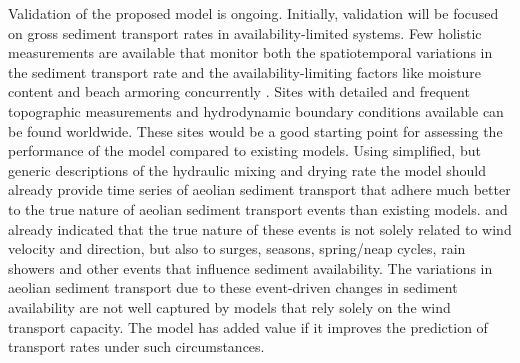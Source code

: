Validation of the proposed model is ongoing. Initially, validation
will be focused on gross sediment transport rates in
availability-limited systems. Few holistic measurements are available
that monitor both the spatiotemporal variations in the sediment
transport rate and the availability-limiting factors like moisture
content and beach armoring concurrently
\citep[e.g.][]{DelgadoFernandez2012, Hoonhout2013}. Sites with
detailed and frequent topographic measurements and hydrodynamic
boundary conditions available can be found worldwide. These sites
would be a good starting point for assessing the performance of the
model compared to existing models. Using simplified, but generic
descriptions of the hydraulic mixing and drying rate the model should
already provide time series of aeolian sediment transport that adhere
much better to the true nature of aeolian sediment transport events
than existing models. \citet{DelgadoFernandez2011} and
\citet{deVries2014b} already indicated that the true nature of these
events is not solely related to wind velocity and direction, but also
to surges, seasons, spring/neap cycles, rain showers and other events
that influence sediment availability. The variations in aeolian
sediment transport due to these event-driven changes in sediment
availability are not well captured by models that rely solely on the
wind transport capacity. The model has added value if it improves the
prediction of transport rates under such circumstances.

